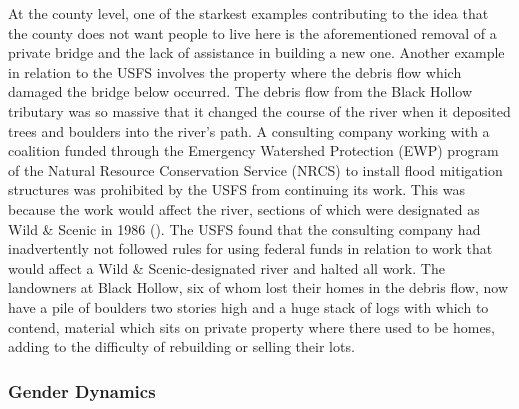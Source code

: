 \documentclass[
]{article}
\begin{document}
At the county level, one of the starkest examples contributing to the idea that the county does not want people to live here is the aforementioned removal of a private bridge and the lack of assistance in building a new one. Another example in relation to the USFS involves the property where the debris flow which damaged the bridge below occurred. The debris flow from the Black Hollow tributary was so massive that it changed the course of the river when it deposited trees and boulders into the river's path. A consulting company working with a coalition funded through the Emergency Watershed Protection (EWP) program of the Natural Resource Conservation Service (NRCS) to install flood mitigation structures was prohibited by the USFS from continuing its work. This was because the work would affect the river, sections of which were designated as Wild \& Scenic in 1986 (). The USFS found that the consulting company had inadvertently not followed rules for using federal funds in relation to work that would affect a Wild \& Scenic-designated river and halted all work. The landowners at Black Hollow, six of whom lost their homes in the debris flow, now have a pile of boulders two stories high and a huge stack of logs with which to contend, material which sits on private property where there used to be homes, adding to the difficulty of rebuilding or selling their lots.

\subsubsection{Gender Dynamics}\label{gender-dynamics}
\end{document}
